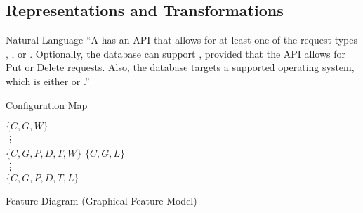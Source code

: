 \subsection{Representations and Transformations}

\begin{frame}{\myframetitle}
	\begin{mycolumns}[b]
		\begin{example}{Natural Language}
			\tiny ``A  has an API that allows for at least one of the request types , , or .
			Optionally, the database can support , provided that the API allows for Put or Delete requests.
			Also, the database targets a supported operating system, which is either  or .''
		\end{example}
		\begin{example}{Configuration Map}
			\tiny
			\begin{mycolumns}[animation=none]
				$\{C,G,W\}$\\
				\hspace{4mm}\vdots\\[1ex]
				$\{C,G,P,D,T,W\}$
			\mynextcolumn
				$\{C,G,L\}$\\
				\hspace{4mm}\vdots\\[1ex]
				$\{C,G,P,D,T,L\}$
			\end{mycolumns}
		\end{example}
		\begin{exampletight}{Feature Diagram (Graphical Feature Model)}
			\centering\tiny
			\featureDiagramConfigurableDatabase
		\end{exampletight}
	\mynextcolumn
		\centering
		\sffamily
\end{mycolumns}
\end{frame}
